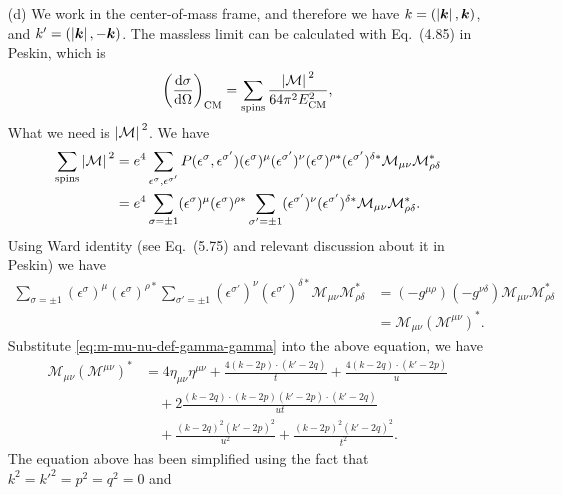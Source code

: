 \documentclass[hyperref, a4paper]{article}
\begin{document}
\begin{itemize}
\item[(d)] We work in the center-of-mass frame, and therefore we have $k = (\abs*{\vb*{k}}, \vb*{k})$, 
and $k' = (\abs*{\vb*{k}}, - \vb*{k})$. 
The massless limit can be calculated with Eq.~(4.85) in Peskin, which is 
\begin{equation}
    \left(\dv{\sigma}{\Omega}\right)_\text{CM} = \sum_\text{spins} \frac{\abs*{\mathcal{M}}^2}{64 \pi^2 E_\text{CM}^2},
\end{equation} 
What we need is $\abs*{\mathcal{M}}^2$. We have 
\[
    \begin{aligned}
        \sum_\text{spins} \abs*{\mathcal{M}}^2 &= e^4 \sum_{\epsilon^\sigma, \epsilon^{\sigma'}} P(\epsilon^\sigma, \epsilon^{\sigma'})
        (\epsilon^\sigma)^\mu (\epsilon^{\sigma'})^\nu (\epsilon^\sigma)^{\rho *} (\epsilon^{\sigma'})^{\delta *} 
        \mathcal{M}_{\mu \nu} \mathcal{M}_{\rho \delta}^* \\
        &= e^4 \sum_{\sigma= \pm 1}  (\epsilon^\sigma)^\mu (\epsilon^\sigma)^{\rho *}
        \sum_{\sigma' = \pm 1} (\epsilon^{\sigma'})^\nu (\epsilon^{\sigma'})^{\delta *}
        \mathcal{M}_{\mu \nu} \mathcal{M}_{\rho \delta}^* . %
    \end{aligned}
\]
Using Ward identity (see Eq.~(5.75) and relevant discussion about it in Peskin) we have
\[
    \begin{aligned}
        \sum_{\sigma= \pm 1}  (\epsilon^\sigma)^\mu (\epsilon^\sigma)^{\rho *}
        \sum_{\sigma' = \pm 1} (\epsilon^{\sigma'})^\nu (\epsilon^{\sigma'})^{\delta *}
        \mathcal{M}_{\mu \nu} \mathcal{M}_{\rho \delta}^*
        &= (- g^{\mu \rho}) (- g^{\nu \delta}) \mathcal{M}_{\mu \nu} \mathcal{M}_{\rho \delta}^* \\
        &= \mathcal{M}_{\mu \nu} (\mathcal{M}^{\mu \nu})^*.
    \end{aligned}
\] 
Substitute \eqref{eq:m-mu-nu-def-gamma-gamma} into the above equation, we have 
\[
    \begin{aligned}
        \mathcal{M}_{\mu \nu} (\mathcal{M}^{\mu \nu})^* 
        &= 4 \eta_{\mu \nu} \eta^{\mu \nu} + \frac{4 (k-2p) \cdot (k'-2q)}{t} + \frac{4 (k-2q) \cdot (k'-2p)}{u} \\
        &\quad + 2 \frac{(k-2q) \cdot (k-2p) (k'-2p) \cdot (k'-2q)}{ut} \\ 
        &\quad + \frac{(k-2q)^2 (k'-2p)^2}{u^2} + \frac{(k-2p)^2 (k'-2q)^2}{t^2}.
    \end{aligned}
\]
The equation above has been simplified using the fact that $k^2 = k'^2 = p^2 = q^2 = 0$ and 

\end{itemize}
\end{document}
